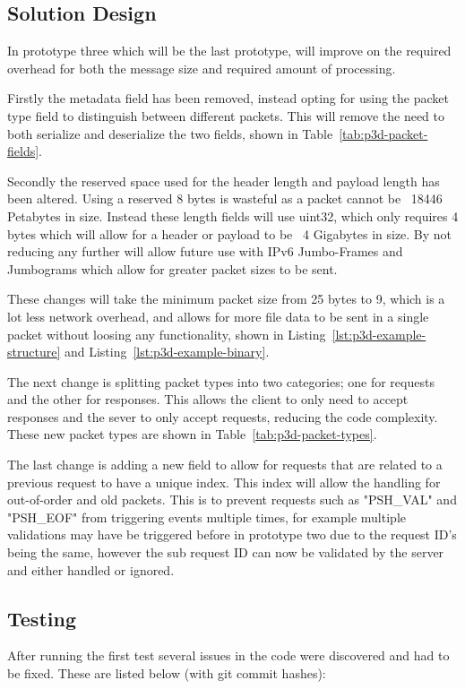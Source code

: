 \subsection*{Solution Design}
In prototype three which will be the last prototype, will improve on the required overhead for both the message size and required amount of processing.

Firstly the metadata field has been removed, instead opting for using the packet type field to distinguish between different packets. This will remove the need to both serialize and deserialize the two fields, shown in Table~\ref{tab:p3d-packet-fields}.

Secondly the reserved space used for the header length and payload length has been altered. Using a reserved 8 bytes is wasteful as a packet cannot be ~18446 Petabytes in size. Instead these length fields will use uint32, which only requires 4 bytes which will allow for a header or payload to be ~4 Gigabytes in size. By not reducing any further will allow future use with IPv6 Jumbo-Frames and Jumbograms which allow for greater packet sizes to be sent. %

These changes will take the minimum packet size from 25 bytes to 9, which is a lot less network overhead, and allows for more file data to be sent in a single packet without loosing any functionality, shown in Listing~\ref{lst:p3d-example-structure} and Listing~\ref{lst:p3d-example-binary}.

The next change is splitting packet types into two categories; one for requests and the other for responses. This allows the client to only need to accept responses and the sever to only accept requests, reducing the code complexity. These new packet types are shown in Table~\ref{tab:p3d-packet-types}.

The last change is adding a new field to allow for requests that are related to a previous request to have a unique index. This index will allow the handling for out-of-order and old packets. This is to prevent requests such as "PSH\_VAL" and "PSH\_EOF" from triggering events multiple times, for example multiple validations may have be triggered before in prototype two due to the request ID's being the same, however the sub request ID can now be validated by the server and either handled or ignored.


\subsection*{Testing}
After running the first test several issues in the code were discovered and had to be fixed. These are listed below (with git commit hashes):

